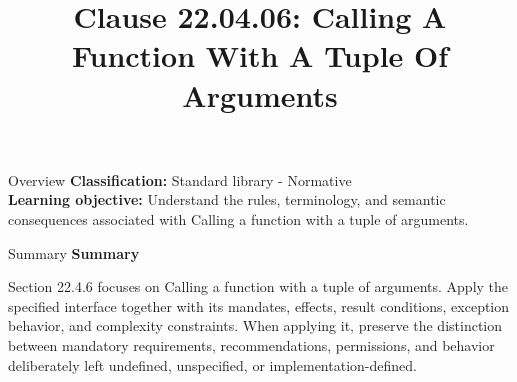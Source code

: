\documentclass[10pt,letterpaper]{article}
\title{Clause 22.04.06: Calling A Function With A Tuple Of Arguments}
\author{}
\date{}
\begin{document}
\maketitle
\begin{CornellOverviewBox}{Overview}
\textbf{Classification:} Standard library - Normative\\[2pt]
\textbf{Learning objective:} Understand the rules, terminology, and semantic consequences associated with Calling a function with a tuple of arguments.
\end{CornellOverviewBox}\begin{CornellSummaryBox}{Summary}
{\sffamily\bfseries\color{Accent} Summary}\par\vspace{3pt}Section 22.4.6 focuses on Calling a function with a tuple of arguments. Apply the specified interface together with its mandates, effects, result conditions, exception behavior, and complexity constraints. When applying it, preserve the distinction between mandatory requirements, recommendations, permissions, and behavior deliberately left undefined, unspecified, or implementation-defined.
\end{CornellSummaryBox}
\end{document}
